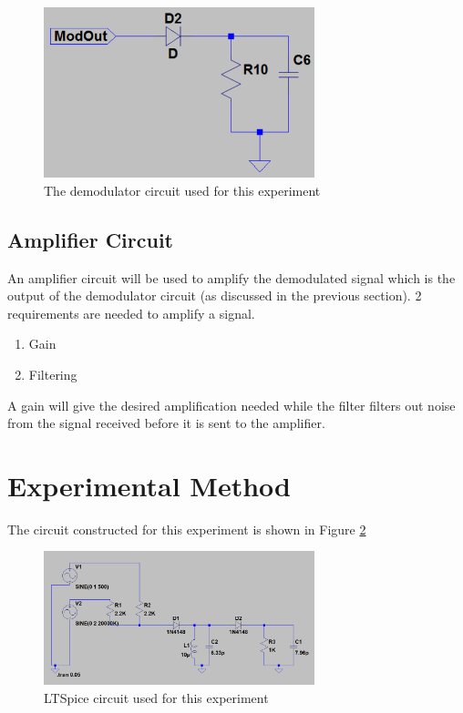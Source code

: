 \documentclass[12pt, a4paper]{article}
\begin{document}
		\begin{figure}[H]
			\centering
			\includegraphics[width=0.7\textwidth]{images/Demodulator_circuit.png}
			\caption{The demodulator circuit used for this experiment}
			\label{fig:demodulator_circuit}
		\end{figure}

	\subsection{Amplifier Circuit} %
	\label{sub:amplifier_circuit}
	 An amplifier circuit will be used to amplify the demodulated signal which is the output of the demodulator circuit (as discussed in the previous section). 2 requirements are needed to amplify a signal.
	 \begin{enumerate}
	 	\item Gain
	 	\item Filtering
	 \end{enumerate}

	 A gain will give the desired amplification needed while the filter filters out noise from the signal received before it is sent to the amplifier.
	



\section{Experimental Method} %
\label{sec:experimental_method}
	The circuit constructed for this experiment is shown in Figure \ref{fig:circuit_1}
	\begin{figure}[H]
		\centering
		\label{fig:circuit_1}
		\includegraphics[width=0.7\textwidth]{images/circuit_1.png}
		\caption{LTSpice circuit used for this experiment}
	\end{figure}
\end{document}
